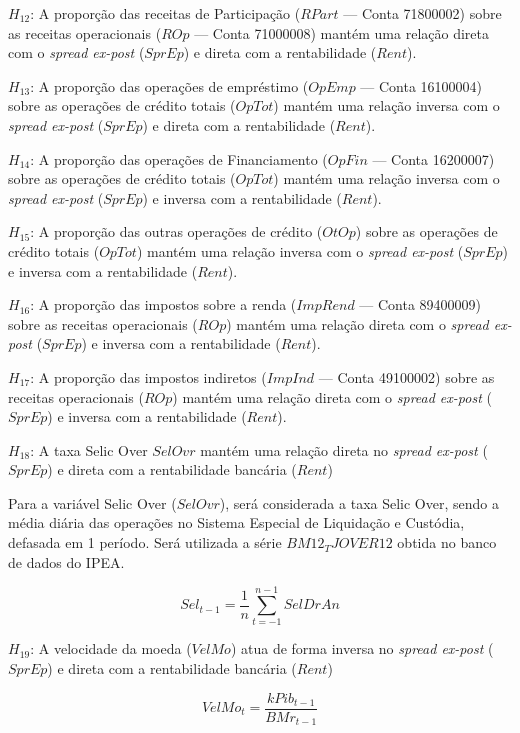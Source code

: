 \documentclass[
  12pt,
  12pt,
  openright,
  oneside,
  a4paper,
  chapter=TITLE,
  section=TITLE,
  subsection=TITLE,
  subsubsection=TITLE,
  english,
  portugues,
  sumario=tradicional]{abntex2}
\begin{document}
\(H_{12}\): A proporção das receitas de Participação (\(RPart\) --- Conta 71800002) sobre as receitas operacionais (\(ROp\) --- Conta 71000008) mantém uma relação direta com o \emph{spread ex-post} (\(SprEp\)) e direta com a rentabilidade (\(Rent\)).

\(H_{13}\): A proporção das operações de empréstimo (\(OpEmp\) --- Conta 16100004) sobre as operações de crédito totais (\(OpTot\)) mantém uma relação inversa com o \emph{spread ex-post} (\(SprEp\)) e direta com a rentabilidade (\(Rent\)).

\(H_{14}\): A proporção das operações de Financiamento (\(OpFin\) --- Conta 16200007) sobre as operações de crédito totais (\(OpTot\)) mantém uma relação inversa com o \emph{spread ex-post} (\(SprEp\)) e inversa com a rentabilidade (\(Rent\)).

\(H_{15}\): A proporção das outras operações de crédito (\(OtOp\)) sobre as operações de crédito totais (\(OpTot\)) mantém uma relação inversa com o \emph{spread ex-post} (\(SprEp\)) e inversa com a rentabilidade (\(Rent\)).

\(H_{16}\): A proporção das impostos sobre a renda (\(ImpRend\) --- Conta 89400009) sobre as receitas operacionais (\(ROp\)) mantém uma relação direta com o \emph{spread ex-post} (\(SprEp\)) e inversa com a rentabilidade (\(Rent\)).

\(H_{17}\): A proporção das impostos indiretos (\(ImpInd\) --- Conta 49100002) sobre as receitas operacionais (\(ROp\)) mantém uma relação direta com o \emph{spread ex-post} (\(SprEp\)) e inversa com a rentabilidade (\(Rent\)).

\(H_{18}\): A taxa Selic Over \(SelOvr\) mantém uma relação direta no \emph{spread ex-post} (\(SprEp\)) e direta com a rentabilidade bancária (\(Rent\))

Para a variável Selic Over (\(SelOvr\)), será considerada a taxa Selic Over, sendo a média diária das operações no Sistema Especial de Liquidação e Custódia, defasada em 1 período. Será utilizada a série \(BM12_TJOVER12\) obtida no banco de dados do IPEA.

\begin{equation}
Sel_{t-1} = \frac{1}{n}\sum_{t=-1}^{n-1}SelDrAn
\end{equation}

\(H_{19}\): A velocidade da moeda (\(VelMo\)) atua de forma inversa no \emph{spread ex-post} (\(SprEp\)) e direta com a rentabilidade bancária (\(Rent\))

\begin{equation}
VelMo_{t} = \frac{k Pib_{t-1}}{BMr_{t-1}}
\end{equation}
\end{document}
